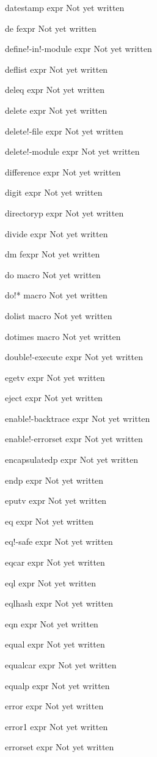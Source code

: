 \documentclass[a4paper,11pt]{article}
\begin{document}
\begin{description}
datestamp expr
Not yet written

de fexpr
Not yet written

define!-in!-module expr
Not yet written

deflist expr
Not yet written

deleq expr
Not yet written

delete expr
Not yet written

delete!-file expr
Not yet written

delete!-module expr
Not yet written

difference expr
Not yet written

digit expr
Not yet written

directoryp expr
Not yet written

divide expr
Not yet written

dm fexpr
Not yet written

do macro
Not yet written

do!* macro
Not yet written

dolist macro
Not yet written

dotimes macro
Not yet written

double!-execute expr
Not yet written

egetv expr
Not yet written

eject expr
Not yet written

enable!-backtrace expr
Not yet written

enable!-errorset expr
Not yet written

encapsulatedp expr
Not yet written

endp expr
Not yet written

eputv expr
Not yet written

eq expr
Not yet written

eq!-safe expr
Not yet written

eqcar expr
Not yet written

eql expr
Not yet written

eqlhash expr
Not yet written

eqn expr
Not yet written

equal expr
Not yet written

equalcar expr
Not yet written

equalp expr
Not yet written

error expr
Not yet written

error1 expr
Not yet written

errorset expr
Not yet written


\end{description}
\end{document}
